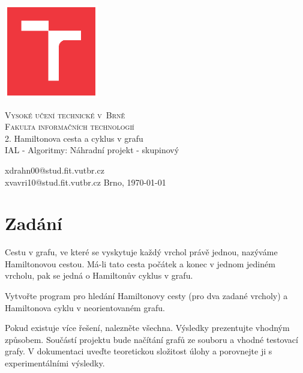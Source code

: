 \documentclass[a4paper,11pt]{article}
\begin{document}
\begin{titlepage}

	\begin{center}
		
        \includegraphics[width=4.1cm,keepaspectratio,trim={1.2cm 1.2cm 1.2cm 1.2cm},clip]{./template-fig/VUT_symbol_barevne_CMYK_CZ}%

		{\Huge\textsc{Vysoké učení technické v~Brně}}\\
		\medskip
		{\huge\textsc{Fakulta informačních technologií}}\\
		{\huge 2. Hamiltonova cesta a cyklus v grafu}\\
		\medskip
		{\LARGE IAL - Algoritmy: Náhradní projekt - skupinový}\\
	\end{center}

    \noindent xdrahn00@stud.fit.vutbr.cz\\ xvavri10@stud.fit.vutbr.cz \Large {\hfill Brno, \today}

\end{titlepage}

\section{Zadání}

Cestu v grafu, ve které se vyskytuje každý vrchol právě jednou, nazýváme Hamiltonovou cestou. Má-li tato cesta počátek a konec v jednom jediném vrcholu, pak se jedná o Hamiltonův cyklus v grafu. 

Vytvořte program pro hledání Hamiltonovy cesty (pro dva zadané vrcholy) a Hamiltonova cyklu v neorientovaném grafu. 

Pokud existuje více řešení, nalezněte všechna. Výsledky prezentujte vhodným způsobem. Součástí projektu bude načítání grafů ze souboru a vhodné testovací grafy. V dokumentaci uveďte teoretickou složitost úlohy a porovnejte ji s experimentálními výsledky.
\end{document}
